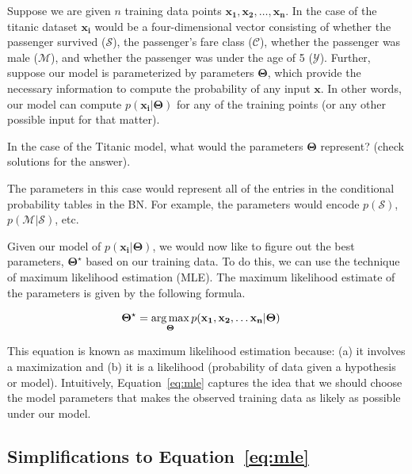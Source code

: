 \documentclass[assignment04_Solutions]{subfiles}
\begin{document}
Suppose we are given $n$ training data points $\mathbf{x_1}, \mathbf{x_2}, \ldots, \mathbf{x_n}$.  In the case of the titanic dataset $\mathbf{x_i}$ would be a four-dimensional vector consisting of whether the passenger survived ($\mathcal{S}$), the passenger's fare class ($\mathcal{C}$), whether the passenger was male ($\mathcal{M}$), and whether the passenger was under the age of 5 ($\mathcal{Y}$).  Further, suppose our model is parameterized by parameters $\mathbf{\Theta}$, which provide the necessary information to compute the probability of any input $\mathbf{x}$.  In other words, our model can compute $p(\mathbf{x_i} | \mathbf{\Theta})$ for any of the training points (or any other possible input for that matter).

\begin{understandingcheck}
In the case of the Titanic model, what would the parameters $\mathbf{\Theta}$ represent? (check solutions for the answer).
\begin{boxedsolution}
The parameters in this case would represent all of the entries in the conditional probability tables in the BN.  For example, the parameters would encode $p(\mathcal{S})$, $p(\mathcal{M}|\mathcal{S})$, etc.
\end{boxedsolution}
\end{understandingcheck}

Given our model of $p(\mathbf{x_i}|\mathbf{\Theta})$, we would now like to figure out the best parameters, $\mathbf{\Theta}^\star$ based on our training data.  To do this, we can use the technique of maximum likelihood estimation (MLE).  The maximum likelihood estimate of the parameters is given by the following formula.

\begin{align}
\mathbf{\Theta^\star} &= \operatorname*{arg\,max}_{\mathbf{\Theta}} p(\mathbf{x_1}, \mathbf{x_2}, \ldots \mathbf{x_n} | \mathbf{\Theta}) \label{eq:mle}
\end{align}

This equation is known as maximum likelihood estimation because: (a) it involves a maximization and (b) it is a likelihood (probability of data given a hypothesis or model).  Intuitively, Equation~\ref{eq:mle} captures the idea that we should choose the model parameters that makes the observed training data as likely as possible under our model.

\subsection{Simplifications to Equation~\ref{eq:mle}}
\end{document}
